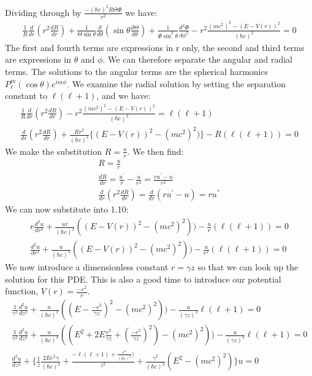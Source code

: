 \documentclass[a4paper,10pt]{article}
\numberwithin{equation}{section}
\begin{document}
Dividing through by $\frac{-(\hbar c)^2R\Theta\Phi}{r^2}$ we have:
\begin{gather}
 \frac{1}{R}\frac{d}{dr}(r^2\frac{dR}{dr})+\frac{1}{\Theta\sin \theta}\frac{d}{d \theta}(\sin \theta \frac{d\Theta}{d \theta})
 +\frac{1}{\Phi \sin ^2 \theta}\frac{d^2\Phi}{d \phi^2}
 -r^2\frac{(mc^2)^2-(E-V(r))^2}{(\hbar c)^2}=0
\end{gather}
The first and fourth terms are expressions in r only, the second and third terms are expressions in $\theta$ and $\phi$.
We can therefore separate the angular and radial terms.
The solutions to the angular terms are the spherical harmonics $P_{\ell}^{m}(\cos \theta)e^{im\phi}$.
We examine the radial solution by setting the separation constant to $\ell(\ell+1)$, and we have:
\begin{gather}
  \frac{1}{R}\frac{d}{dr}(r^2\frac{dR}{dr})-r^2\frac{(mc^2)^2-(E-V(r))^2}{(\hbar c)^2}=\ell(\ell+1)\\
  \frac{d}{dr}(r^2\frac{dR}{dr})+\frac{Rr^2}{(\hbar c)^2}\{(E-V(r))^2-(mc^2)^2)\}-R(\ell(\ell+1))=0
\end{gather}
We make the substitution $R=\frac{u}{r}$. We then find:
\begin{gather}
R = \frac{u}{r}\\
\frac{dR}{dr}=\frac{u^{'}}{r}-\frac{u}{r^2}= \frac{ru^{'}-u}{r^2}\\
\frac{d}{dr}(r^2\frac{dR}{dr})=\frac{d}{dr}(ru^{'}-u)=ru^{''}
\end{gather}
We can now substitute into 1.10:
\begin{gather}
 r\frac{d^2u}{dr^2}+\frac{ur}{(\hbar c)^2}((E-V(r))^2-(mc^2)^2))-\frac{u}{r}(\ell(\ell+1))=0\\
 \frac{d^2u}{dr^2}+\frac{u}{(\hbar c)^2}((E-V(r))^2-(mc^2)^2))-\frac{u}{r^2}(\ell(\ell+1))=0
\end{gather}
We now introduce a dimensionless constant $r=\gamma z$ so that we can look up the solution for this PDE.
This is also a good time to introduce our potential function, $V(r) = \frac{-e^2}{r}$.
\begin{gather}
 \frac{1}{\gamma ^2}\frac{d^2u}{dz^2}+\frac{u}{(\hbar c)^2}((E-\frac{-e^2}{\gamma z})^2-(mc^2)^2))-\frac{u}{(\gamma z)^2}\ell(\ell+1)=0\\
 \frac{1}{\gamma ^2}\frac{d^2u}{dz^2}+\frac{u}{(\hbar c)^2}((E^2+2E\frac{e^2}{\gamma z}+(\frac{-e^2}{\gamma z})^2   )-(mc^2)^2))-\frac{u}{(\gamma z)^2}\ell(\ell+1)=0\\
 \frac{d^2u}{dz^2}+\{\frac{1}{z}\frac{2Ee^2\gamma}{(\hbar c)^2}+\frac{-\ell(\ell+1)+\frac{e^4}{(\hbar c)^2})}{z^2}+\frac{\gamma^2}{(\hbar c)^2}(E^2-(mc^2)^2) \}u=0
\end{gather}
\end{document}
